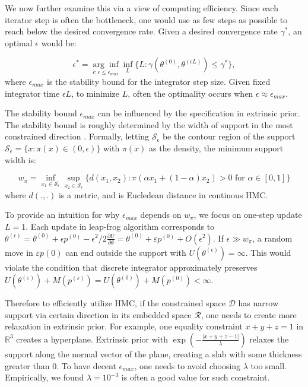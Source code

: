\documentclass[10pt]{article}
\newcommand{\mc}[1]{\mathcal{#1}}
\DeclareMathOperator{\1}{\mathbbm{1}}
\begin{document}
We now further examine this via a view of computing efficiency. Since each iterator step is often the bottleneck, one would use as few steps as possible to reach below the desired convergence rate.  Given a desired convergence rate $\gamma^*$, an optimal $\epsilon$ would be:

$$\epsilon^* =  \underset{\epsilon: \epsilon \le \epsilon_{max}}{\arg\inf}\inf_{L}\{L: \gamma \left(\theta^{(0)}, \theta^{(\epsilon L)} \right) \le \gamma^*   \},$$
where $\epsilon_{max}$ is the stability bound for the integrator step size. Given fixed integrator time $\epsilon L$, to minimize $L$, often the optimality occurs when $\epsilon\approx \epsilon_{max}$.

The stability bound $\epsilon_{max}$ can be influenced by the specification in extrinsic prior. The stability bound is roughly determined by the width of support in the most constrained direction  \citep{neal2011mcmc}. Formally, letting $\mc S_{\epsilon}$ be the contour region of the support $\mc S_{\epsilon}=\{x: \pi(x)\in (0,\epsilon)\}$ with $\pi(x)$ as the density, the minimum support width is:

$$w_\pi = \underset{{x_1\in \mc S_\epsilon}}{\inf}\underset{x_2\in \mc S_\epsilon}{\sup} \{ d(x_1, x_2): \pi(\alpha x_1 + (1-\alpha)x_2)>0 \text{ for } \alpha \in [0,1]  \}$$
where $d(.,.)$ is a metric, and is Eucledean distance in continous HMC.


To provide an intuition for why $\epsilon_{max}$ depends on $w_\pi$, we focus on one-step update $L=1$. Each update in leap-frog algorithm corresponds to $\theta^{(\epsilon)}=\theta^{(0)} + \epsilon  p^{(0)} - \epsilon^2/2  \frac{\partial U}{\partial  \theta } = \theta^{(0)} + \varepsilon  p^{(0)} + O(\epsilon^2)$. If $\epsilon \gg w_\pi$, a random move in $\varepsilon  p(0)$ can end outside the support with $U(\theta^{(\epsilon)})=\infty$. This would violate the condition that discrete integrator approximately preserves $U(\theta^{(\varepsilon)})+M(p^{(\varepsilon)}) = U(\theta^{(0)})+M(p^{(0)})< \infty$.

Therefore to efficiently utilize HMC, if the constrained space $\mc D$ has narrow support via certain direction in its embedded space $\mc R$, one needs to create more relaxation in extrinsic prior. For example, one equality constraint $x+y+z=1$ in $\mathbb{R}^3$ creates a hyperplane. Extrinsic prior with $\exp(- \frac{|x+y+z-1|}{\lambda})$ relaxes the support along the normal vector of the plane, creating a slab with some thickness greater than $0$. To have decent $\epsilon_{max}$, one needs to avoid choosing $\lambda$ too small. Empirically, we found $\lambda= 10^{-3}$ is often a good value for such constraint.
\end{document}
